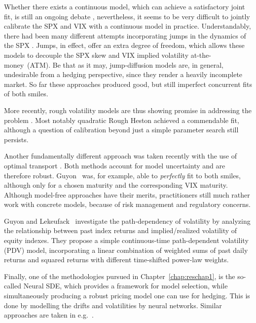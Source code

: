 Whether there exists a continuous model, which can achieve a satisfactory joint fit, is still an ongoing debate \cite{Acciaio2020ShortFutures, Guyon2020InversionMarket}, nevertheless, it seems to be very difficult to jointly calibrate the SPX and VIX with a continuous model in practice. Understandably, there had been many different attempts incorporating jumps in the dynamics of the SPX \cite{Cont2011ADERIVATIVES, Baldeaux2014ConsistentModel, Bardgett2019InferringMarkets, Papanicolaou2014AVolatilities, Kokholm2015JointModels, Pacati2018SmilingModel}. Jumps, in effect, offer an extra degree of freedom, which allows these models to decouple the SPX skew and VIX implied volatility at-the-money~(ATM). Be that as it may, jump-diffusion models are, in general, undesirable from a hedging perspective, since they render a heavily incomplete market. So far these approaches produced good, but still imperfect concurrent fits of both smiles.

More recently, rough volatility models are thus showing promise in addressing the problem \cite{Jacquier2021RoughOptions, Horvath2020VolatilityModels, DeMarco2018VolatilityModels}. Most notably quadratic Rough Heston \cite{Gatheral2020TheProblem} achieved a commendable fit, although a question of calibration beyond just a simple parameter search still persists.

Another fundamentally different approach was taken recently with the use of optimal transport \cite{Guyon2020TheSolved, Guo2022JointTransport}. Both methods account for model uncertainty and are therefore robust. Guyon~\cite{Guyon2020TheSolved} was, for example, able to \textit{perfectly} fit to both smiles, although only for a chosen maturity and the corresponding VIX maturity. Although model-free approaches have their merits, practitioners still much rather work with concrete models, because of risk management and regulatory concerns. 

Guyon and Lekeufack~\cite{Guyon2022VolatilityPath-Dependent} investigate the path-dependency of volatility by analyzing the relationship between past index returns and implied/realized volatility of equity indexes. They propose a simple continuous-time path-dependent volatility (PDV) model, incorporating a linear combination of weighted sums of past daily returns and squared returns with different time-shifted power-law weights.

Finally, one of the methodologies pursued in Chapter~\ref{chap:reschap1}, is the so-called Neural SDE, which provides a framework for model selection, while simultaneously producing a robust pricing model one can use for hedging. This is done by modelling the drifts and volatilities by neural networks. Similar approaches are taken in e.g.~\cite{Guyon2022NeuralCalibration, Cuchiero2020AModels}.

